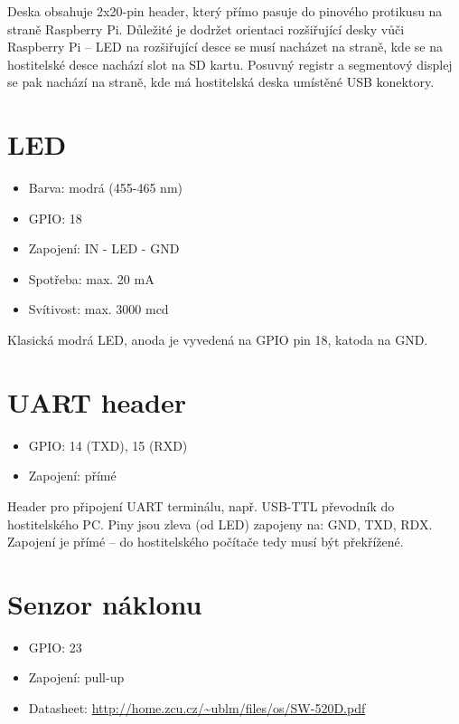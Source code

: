 \documentclass{article}
\begin{document}
Deska obsahuje 2x20-pin header, který přímo pasuje do pinového protikusu na straně Raspberry Pi. Důležité je dodržet orientaci rozšiřující desky vůči Raspberry Pi -- LED na rozšiřující desce se musí nacházet na straně, kde se na hostitelské desce nachází slot na SD kartu. Posuvný registr a segmentový displej se pak nachází na straně, kde má hostitelská deska umístěné USB konektory.

\section{LED}

\begin{itemize}
	\item Barva: modrá (455-465 nm)
	\item GPIO: 18
	\item Zapojení: IN - LED - GND
	\item Spotřeba: max. 20 mA
	\item Svítivost: max. 3000 mcd
\end{itemize}

Klasická modrá LED, anoda je vyvedená na GPIO pin 18, katoda na GND.

\section{UART header}

\begin{itemize}
	\item GPIO: 14 (TXD), 15 (RXD)
	\item Zapojení: přímé
\end{itemize}

Header pro připojení UART terminálu, např. USB-TTL převodník do hostitelského PC. Piny jsou zleva (od LED) zapojeny na: GND, TXD, RDX. Zapojení je přímé -- do hostitelského počítače tedy musí být překřížené.

\section{Senzor náklonu}

\begin{itemize}
	\item GPIO: 23
	\item Zapojení: pull-up
	\item Datasheet: \url{http://home.zcu.cz/~ublm/files/os/SW-520D.pdf}
\end{itemize}
\end{document}
